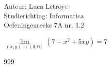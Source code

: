 \documentclass[a4paper]{article}
\begin{document}
  
\noindent \large Auteur: Luca Letroye \\
\noindent \large Studierichting: Informatica\\
\noindent \large Oefeningenreeks 7A nr. 1.2\\

\medskip
\normalsize

$\lim\limits_{(x,y)\rightarrow(0,0)} (7-x^2+5xy)= 7$






\begin{thebibliography}{999}
\end{thebibliography}
\end{document}
